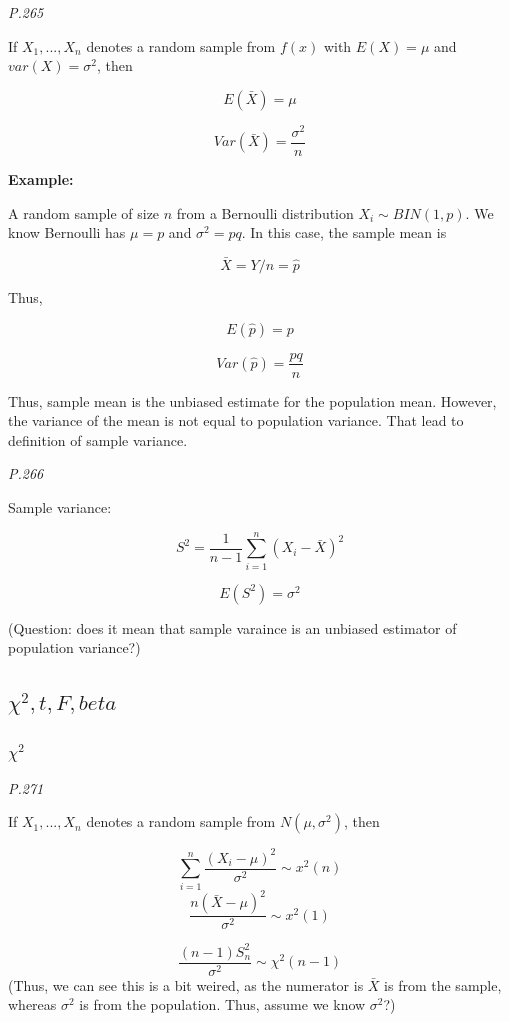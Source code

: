 \documentclass[]{book}
\begin{document}
\emph{P.265}

If \(X_1,..., X_n\) denotes a random sample from \(f(x)\) with \(E(X)=\mu\) and \(var(X)=\sigma^2\), then

\[E(\bar{X})=\mu\]

\[Var(\bar{X})=\frac{\sigma^2}{n}\]

\textbf{Example:}

A random sample of size \(n\) from a Bernoulli distribution \(X_i \sim BIN(1,p)\). We know Bernoulli has \(\mu=p\) and \(\sigma^2 =pq\). In this case, the sample mean is

\[\bar{X}=Y/n=\hat{p}\]

Thus,

\[E(\hat{p})=p\]

\[Var (\hat{p})=\frac{pq}{n}\]

Thus, sample mean is the unbiased estimate for the population mean. However, the variance of the mean is not equal to population variance. That lead to definition of sample variance.

\emph{P.266}

Sample variance:

\[S^2=\frac{1}{n-1}\sum_{i=1}^n(X_i-\bar{X})^2\]

\[E(S^2)=\sigma^2\]

(Question: does it mean that sample varaince is an unbiased estimator of population variance?)

\hypertarget{chi2-t-f-beta}{%
\subsection{\texorpdfstring{\(\chi^2, t, F, beta\)}{\textbackslash chi\^{}2, t, F, beta}}\label{chi2-t-f-beta}}

\hypertarget{chi2}{%
\subsubsection{\texorpdfstring{\(\chi^2\)}{\textbackslash chi\^{}2}}\label{chi2}}

\emph{P.271}

If \(X_1,...,X_n\) denotes a random sample from \(N(\mu,\sigma^2)\), then

\[\sum_{i=1}^n \frac{(X_i-\mu)^2}{\sigma^2} \sim x^2(n)\]
\[\frac{n(\bar{X}-\mu)^2}{\sigma^2}\sim x^2(1)\]

\[\frac{(n-1)S_n^2}{\sigma^2} \sim \chi^2(n-1)\]
(Thus, we can see this is a bit weired, as the numerator is \(\bar{X}\) is from the sample, whereas \(\sigma^2\) is from the population. Thus, assume we know \(\sigma^2\)?)
\end{document}

